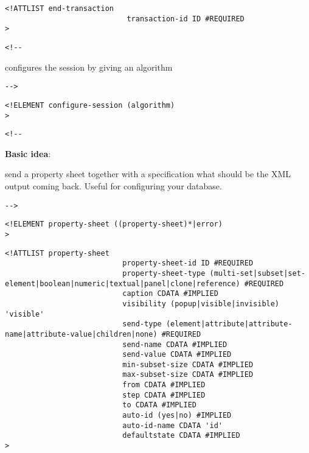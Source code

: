 \begin{verbatim}
<!ATTLIST end-transaction 
                            transaction-id ID #REQUIRED
>\end{verbatim}

\begin{verbatim}<!--\end{verbatim}
  

     configures the session by giving an algorithm     

      
 \begin{verbatim}-->\end{verbatim}



\begin{verbatim}
<!ELEMENT configure-session (algorithm) 
>\end{verbatim}

\begin{verbatim}<!--\end{verbatim}
  


       \textbf{Basic idea}: \parbox[t]{5cm}{send a property sheet together with a specification
                                            what should be the XML output coming back.
                                            Useful for configuring your database.}
       
 \begin{verbatim}-->\end{verbatim}



\begin{verbatim}
<!ELEMENT property-sheet ((property-sheet)*|error) 
>\end{verbatim}

\begin{verbatim}
<!ATTLIST property-sheet 
                           property-sheet-id ID #REQUIRED
                           property-sheet-type (multi-set|subset|set-element|boolean|numeric|textual|panel|clone|reference) #REQUIRED
                           caption CDATA #IMPLIED
                           visibility (popup|visible|invisible) 'visible'
                           send-type (element|attribute|attribute-name|attribute-value|children|none) #REQUIRED
                           send-name CDATA #IMPLIED
                           send-value CDATA #IMPLIED
                           min-subset-size CDATA #IMPLIED
                           max-subset-size CDATA #IMPLIED
                           from CDATA #IMPLIED
                           step CDATA #IMPLIED
                           to CDATA #IMPLIED
                           auto-id (yes|no) #IMPLIED
                           auto-id-name CDATA 'id'
                           defaultstate CDATA #IMPLIED
>\end{verbatim}

